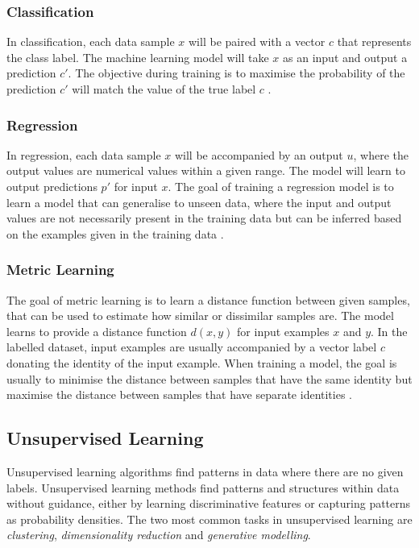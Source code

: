 \subsubsection{Classification}

In classification, each data sample $x$ will be paired with a vector $c$ that represents the class label. 
The machine learning model will take $x$ as an input and output a prediction $c'$. 
The objective during training is to maximise the probability of the prediction $c'$ will match the value of the true label $c$ \citep{murphy2012machine}. 

\subsubsection{Regression}

In regression, each data sample $x$ will be accompanied by an output $u$, where the output values are numerical values within a given range. 
The model will learn to output predictions $p'$ for input $x$. The goal of training a regression model is to learn a model that can generalise to unseen data, where the input and output values are not necessarily present in the training data but can be inferred based on the examples given in the training data \citep{murphy2012machine}. 

\subsubsection{Metric Learning}
\label{c2:subsubsec:metric}

The goal of metric learning is to learn a distance function between given samples, that can be used to estimate how similar or dissimilar samples are. 
The model learns to provide a distance function $d(x,y)$ for input examples $x$ and $y$. In the labelled dataset, input examples are usually accompanied by a vector label $c$ donating the identity of the input example. 
When training a model, the goal is usually to minimise the distance between samples that have the same identity but maximise the distance between samples that have separate identities \citep{kulis2013metric}.

\subsection{Unsupervised Learning}

Unsupervised learning algorithms find patterns in data where there are no given labels. 
Unsupervised learning methods find patterns and structures within data without guidance, either by learning discriminative features or capturing patterns as probability densities. 
The two most common tasks in unsupervised learning are \textit{clustering}, \textit{dimensionality reduction} and \textit{generative modelling}.

